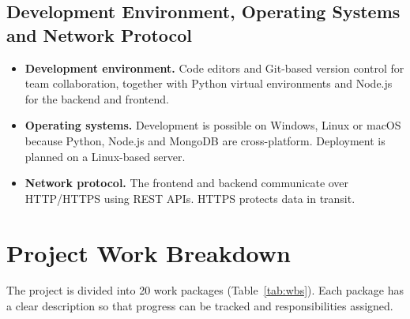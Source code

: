 \documentclass[12pt,a4paper]{report}
\begin{document}
\subsection*{Development Environment, Operating Systems and Network Protocol}
\begin{itemize}
  \item \textbf{Development environment.} Code editors and Git-based version control for team collaboration, together with Python virtual environments and Node.js for the backend and frontend.
  \item \textbf{Operating systems.} Development is possible on Windows, Linux or macOS because Python, Node.js and MongoDB are cross-platform. Deployment is planned on a Linux-based server.
  \item \textbf{Network protocol.} The frontend and backend communicate over HTTP/HTTPS using REST APIs. HTTPS protects data in transit.
\end{itemize}

\section{Project Work Breakdown}
The project is divided into 20 work packages (Table~\ref{tab:wbs}). Each package has a clear description so that progress can be tracked and responsibilities assigned.
\end{document}
